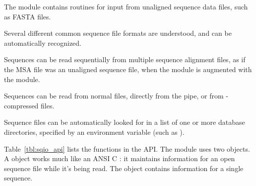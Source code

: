 
The  module contains routines for input from unaligned
sequence data files, such as FASTA files.

Several different common sequence file formats are understood, and can
be automatically recognized.

Sequences can be read sequentially from multiple sequence alignment
files, as if the MSA file was an unaligned sequence file, when the
module is augmented with the  module.

Sequences can be read from normal files, directly from the
 pipe, or from -compressed files.

Sequence files can be automatically looked for in a list of one or
more database directories, specified by an environment variable (such
as ).

Table~\ref{tbl:sqio_api} lists the functions in the  API.
The module uses two objects. A  object works much
like an ANSI C : it maintains information for an open
sequence file while it's being read. The  object
contains information for a single sequence.

